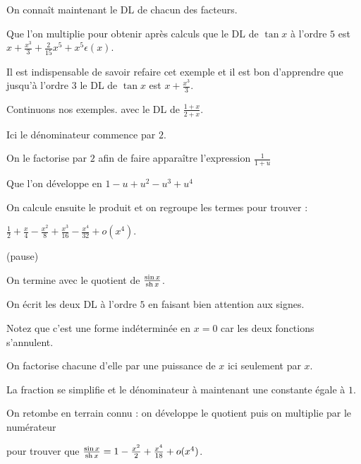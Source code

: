 \change

On connaît maintenant le DL de chacun des facteurs.

\change

Que l'on multiplie pour obtenir après calculs
que le DL de $\tan x$
à l'ordre $5$ est 
$x +\frac{x^3}{3}+\frac{2}{15}x^5+x^5\epsilon(x)$.

Il est indispensable de savoir refaire cet exemple
et il est bon d'apprendre que jusqu'à l'ordre $3$
le DL de $\tan x$ est $x +\frac{x^3}{3}$.





\diapo

Continuons nos exemples.
avec le DL de $\frac{1+x}{2+x}$.

Ici le dénominateur commence par $2$.

\change

On le factorise par $2$ afin de faire apparaître l'expression
$\frac{1}{1+u}$

\change

Que l'on développe en $1-u+u^2-u^3+u^4$

\change

On calcule ensuite le produit et on regroupe les termes pour trouver :

$\frac12+\frac{x}{4}-\frac{x^2}{8}+\frac{x^3}{16}-\frac{x^4}{32} + o(x^4)$.


(pause)
 
\change 

On termine avec le quotient de $\frac{\sin x}{\mathop{\mathrm{sh}}\nolimits x}$.


\change

On écrit les deux DL à l'ordre $5$ en faisant bien attention aux signes.

Notez que c'est une forme indéterminée en $x=0$ car les deux fonctions s'annulent.

\change

On factorise chacune d'elle par une puissance de $x$ ici seulement par $x$.

\change

La fraction se simplifie et le dénominateur à maintenant une constante égale à $1$.

On retombe en terrain connu : on développe le quotient puis on multiplie par le numérateur

\change

\change

pour trouver que 
$\frac{\sin x}{\mathop{\mathrm{sh}}\nolimits x}= 1-\frac{x^2}{2}+\frac{x^4}{18} + o(x^4)$.


